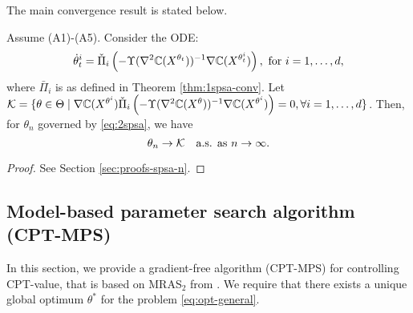 
The main convergence result is stated below.
\begin{theorem}
\label{thm:2spsa}
Assume (A1)-(A5). 
Consider the ODE: 
$$
\dot\theta^{i}_t = \check\Pi_{i}\left( - \Upsilon(\nabla^2 \mathbb{C}(X^{\theta_t}))^{-1} \nabla \mathbb{C}(X^{\theta^{i}_t}) \right), \text { for }i=1,\dots,d,$$
where 
$\bar\Pi_{i}$ is as defined in Theorem \ref{thm:1spsa-conv}. Let $\mathcal{K} = \{\theta \in \Theta \mid
\nabla \mathbb{C}(X^{\theta^{i}})  \check\Pi_{i}\left(-\Upsilon(\nabla^2 \mathbb{C}(X^{\theta}))^{-1} \nabla \mathbb{C}(X^{\theta^{i}})\right)
=0, \forall i=1,\ldots,d\}$. Then, for $\theta_n$ governed by \eqref{eq:2spsa}, 
we have
$$\theta_n \rightarrow \mathcal{K}  \text{~~ a.s. as } n\rightarrow \infty.$$ 
\end{theorem}

\begin{proof}
See Section \ref{sec:proofs-spsa-n}.
\end{proof}


\subsection{Model-based parameter search algorithm (CPT-MPS)}
\label{sec:mras}
In this section, we provide a gradient-free algorithm (CPT-MPS) for controlling CPT-value, that is based on MRAS$_2$ from \cite{chang2013simulation}. We require that there exists a unique global optimum $\theta^*$ for the problem \eqref{eq:opt-general}.



